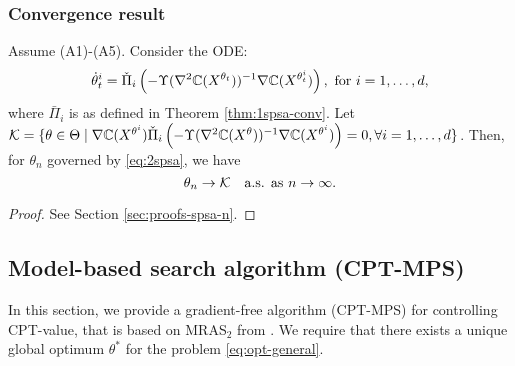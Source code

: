 
\subsubsection*{Convergence result}
\begin{theorem}
\label{thm:2spsa}
Assume (A1)-(A5). 
Consider the ODE: 
$$
\dot\theta^{i}_t = \check\Pi_{i}\left( - \Upsilon(\nabla^2 \mathbb{C}(X^{\theta_t}))^{-1} \nabla \mathbb{C}(X^{\theta^{i}_t}) \right), \text { for }i=1,\dots,d,$$
where 
$\bar\Pi_{i}$ is as defined in Theorem \ref{thm:1spsa-conv}. Let $\mathcal{K} = \{\theta \in \Theta \mid
\nabla \mathbb{C}(X^{\theta^{i}})  \check\Pi_{i}\left(-\Upsilon(\nabla^2 \mathbb{C}(X^{\theta}))^{-1} \nabla \mathbb{C}(X^{\theta^{i}})\right)
=0, \forall i=1,\ldots,d\}$. Then, for $\theta_n$ governed by \eqref{eq:2spsa}, 
we have
$$\theta_n \rightarrow \mathcal{K}  \text{~~ a.s. as } n\rightarrow \infty.$$ 
\end{theorem}

\begin{proof}
See Section \ref{sec:proofs-spsa-n}.
\end{proof}


\subsection{Model-based search algorithm (CPT-MPS)}
\label{sec:mras}
In this section, we provide a gradient-free algorithm (CPT-MPS) for controlling CPT-value, that is based on MRAS$_2$ from \cite{chang2013simulation}. We require that there exists a unique global optimum $\theta^*$ for the problem \eqref{eq:opt-general}.



